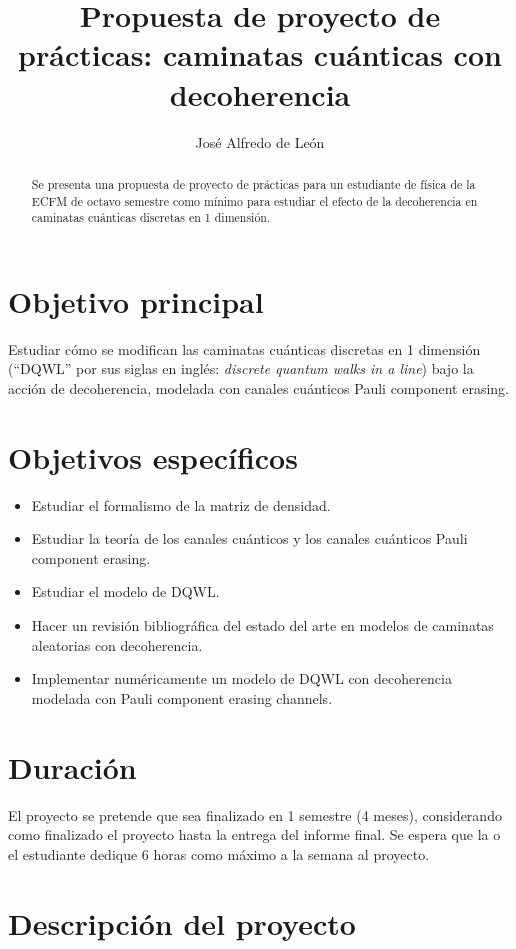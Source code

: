 \documentclass[11pt,letterpaper]{article}
\title{Propuesta de proyecto de prácticas: caminatas cuánticas con decoherencia}
\author{José Alfredo de León}
\begin{document}
\maketitle

\begin{abstract}
Se presenta una propuesta de proyecto de prácticas para un estudiante de
física de la ECFM de octavo semestre como mínimo para estudiar el efecto
de la decoherencia en caminatas cuánticas discretas en 1 dimensión.
\end{abstract}

\section{Objetivo principal}
Estudiar cómo se modifican las caminatas cuánticas discretas en 1 dimensión
(``DQWL'' por sus siglas en inglés: \textit{discrete quantum walks in a line})
bajo la acción de decoherencia, modelada con canales cuánticos Pauli 
component erasing.

\section{Objetivos específicos}
\begin{itemize}
\item Estudiar el formalismo de la matriz de densidad. 
\item Estudiar la teoría de los canales cuánticos y los canales cuánticos Pauli component erasing. 
\item Estudiar el modelo de DQWL.
\item Hacer un revisión bibliográfica del estado del arte en modelos de caminatas aleatorias con decoherencia. 
\item Implementar numéricamente un modelo de DQWL con decoherencia modelada 
con Pauli component erasing channels.
\end{itemize}

\section{Duración}
El proyecto se pretende que sea finalizado en 1 semestre (4 meses), considerando
como finalizado el proyecto hasta la entrega del informe final. Se espera 
que la o el estudiante dedique 6 horas como máximo a la semana al proyecto. 

\section{Descripción del proyecto}
\end{document}
